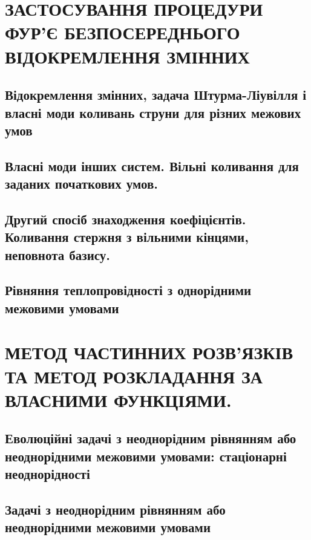 \documentclass[a4paper, 14pt]{extreport}
\begin{document}
\tableofcontents
\setcounter{page}{2}

\chapter{ЗАСТОСУВАННЯ ПРОЦЕДУРИ ФУР’Є БЕЗПОСЕРЕДНЬОГО ВІДОКРЕМЛЕННЯ ЗМІННИХ}

\section{Відокремлення змінних, задача Штурма-Ліувілля і власні моди коливань струни для різних межових умов}
%

\section{Власні моди інших систем. Вільні коливання для заданих початкових умов.}
%
%

\section{Другий спосіб знаходження коефіцієнтів. Коливання стержня з вільними кінцями, неповнота базису.}
%
%

\section{Рівняння теплопровідності з однорідними межовими умовами}
%
%
%

\chapter{МЕТОД ЧАСТИННИХ РОЗВ’ЯЗКІВ ТА МЕТОД РОЗКЛАДАННЯ ЗА ВЛАСНИМИ ФУНКЦІЯМИ.}

\section{Еволюційні задачі з неоднорідним рівнянням або неоднорідними межовими умовами: стаціонарні неоднорідності}
%
%

\section{Задачі з неоднорідним рівнянням або неоднорідними межовими умовами}
%
%





\end{document}
